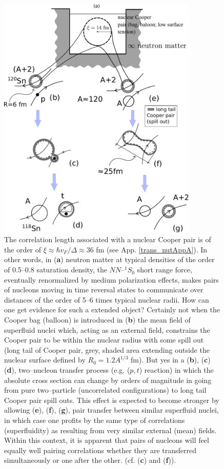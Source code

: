 \documentclass[a4paper,11pt]{book}
\numberwithin{equation}{section}
\numberwithin{figure}{section}
\numberwithin{table}{section}
\begin{document}
\begin{figure}
\centerline{\includegraphics*[width=0.85\textwidth,angle=0]{figs/fig_gamma.pdf}}
\caption{The correlation length associated with a nuclear Cooper pair is of the order of $\xi\approx \hbar v_F/\Delta\approx 36 $ fm (see App. \ref{trans_nutAppA}). In other words, in (\textbf{a}) neutron matter at typical densities of the order of 0.5--0.8 saturation density, the $NN$--$^{1}S_0$ short range force, eventually renormalized by medium polarization effects, makes pairs of nucleons moving in time reversal states to communicate over distances of the order of 5--6 times typical nuclear radii. How can one get evidence for such a extended object? Certainly not when the Cooper bag (balloon) is introduced in (\textbf{b}) the mean field of superfluid nuclei which, acting as an external field, constrains the Cooper pair to be within the nuclear radius with some spill out (long tail of Cooper pair, grey, shaded area extending outside the nuclear surface defined by $R_0=1.2A^{1/3}$ fm). But yes in a (\textbf{b}), (\textbf{c}) (\textbf{d}), two--nucleon transfer process (e.g. ($p,t$) reaction) in which the absolute cross section can change by orders of magnitude in going from pure two--particle (uncorrelated configurations) to long tail Cooper pair spill outs. This effect is expected to become stronger by allowing (\textbf{e}), (\textbf{f}), (\textbf{g}), pair transfer between similar superfluid nuclei, in which case one profits by the same type of correlations (superfluidity) as resulting from very similar external (mean) fields.
Within this context, it is apparent that pairs of nucleons will feel equally well pairing correlations whether they are transferred simultaneously or one after the other. (cf. (\textbf{c}) and (\textbf{f})).}\label{fig_gamma}
\end{figure}
\end{document}
